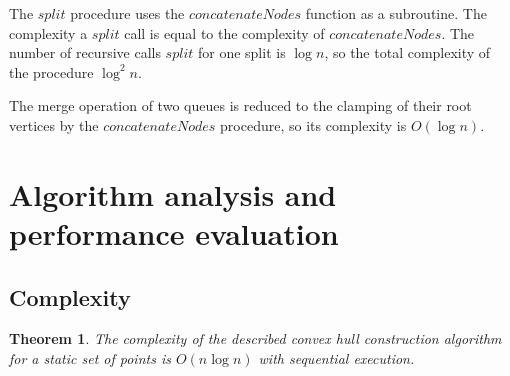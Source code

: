 \documentclass[conference]{IEEEtran}
\theoremstyle{plane}
\newtheorem{theorem}{Theorem}[section]
\begin{document}
		The $split$ procedure uses the $concatenateNodes$ function as a subroutine. The complexity a $split$ call is equal to the complexity of $concatenateNodes$. The number of recursive calls $split$ for one split is $\log n$, so the total complexity of the procedure $\log^2 n$.
		
		The merge operation of two queues is reduced to the clamping of their root vertices by the $concatenateNodes$ procedure, so its complexity is $O(\log n)$.


\section{Algorithm analysis and performance evaluation}
\subsection{Complexity}


		\begin{theorem}
			The complexity of the described convex hull construction algorithm for a static set of points is $O(n\log n)$ with sequential execution.
		\end{theorem}
		
\end{document}
